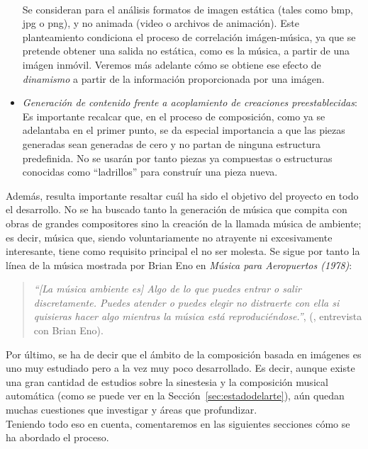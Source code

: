 \begin{itemize}
			\\Se consideran para el análisis formatos de imagen estática (tales como bmp, jpg o png), y no animada (video o archivos de animación). Este planteamiento condiciona el proceso de correlación imágen-música, ya que se pretende obtener una salida no estática, como es la música, a partir de una imágen inmóvil. Veremos más adelante cómo se obtiene ese efecto de \emph{dinamismo} a partir de la información proporcionada por una imágen.
		\item \emph{Generación de contenido frente a acoplamiento de creaciones preestablecidas}:
			\vspace{0.1in}
			\\Es importante recalcar que, en el proceso de composición, como ya se adelantaba en el primer punto, se da especial importancia a que las piezas generadas sean generadas de cero y no partan de ninguna estructura predefinida. No se usarán por tanto piezas ya compuestas o estructuras conocidas como ``ladrillos'' para construír una pieza nueva.
		\end{itemize}
		
		Además, resulta importante resaltar cuál ha sido el objetivo del proyecto en todo el desarrollo. No se ha buscado tanto la generación de música que compita con obras de grandes compositores sino la creación de la llamada música de ambiente; es decir, música que, siendo voluntariamente no atrayente ni excesivamente interesante, tiene como requisito principal el no ser molesta. Se sigue por tanto la línea de la música mostrada por Brian Eno en \emph{Música para Aeropuertos (1978)}:
		
		\begin{quote}
		\emph{``[La música ambiente es] Algo de lo que puedes entrar o salir discretamente. Puedes atender o puedes elegir no distraerte con ella si quisieras hacer algo mientras la música está reproduciéndose.''}, (\cite{BrianEnoInterview}, entrevista con Brian Eno).
		\end{quote}		
		
		Por último, se ha de decir que el ámbito de la composición basada en imágenes es uno muy estudiado pero a la vez muy poco desarrollado. Es decir, aunque existe una gran cantidad de estudios sobre la sinestesia y la composición musical automática (como se puede ver en la Sección~\ref{sec:estadodelarte}), aún quedan muchas cuestiones que investigar y áreas que profundizar.\\
		
		Teniendo todo eso en cuenta, comentaremos en las siguientes secciones cómo se ha abordado el proceso.
		



